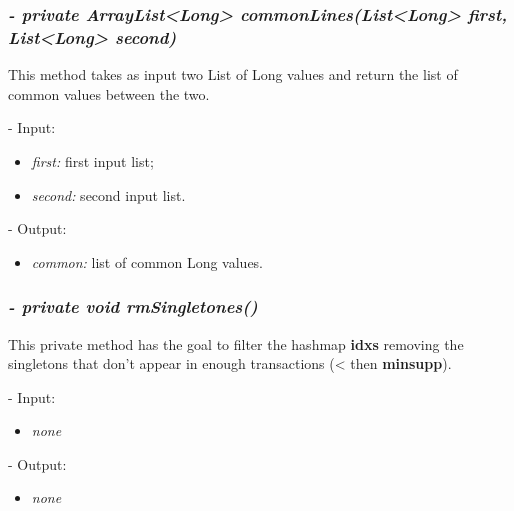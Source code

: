 \documentclass[]{report}
\begin{document}
	\subsubsection*{\textit{\textbf{-} private ArrayList<Long> commonLines(List<Long> first, List<Long> second)}}   	
	This method takes as input two List of Long values and return the list of common values between the two.    
	\begin{description}
		\item - Input:
		\begin{itemize}
			\item \textit{first:} first input list;
			\item \textit{second:} second input list.
		\end{itemize}
	\end{description}	
	\begin{description}
		\item - Output:
		\begin{itemize}
			\item \textit{common:} list of common Long values. 
		\end{itemize}
	\end{description}
	
	\subsubsection*{\textit{\textbf{-} private void rmSingletones()}}   	
	This private method has the goal to filter the hashmap \textbf{idxs} removing the singletons that don't appear in enough transactions (< then \textbf{minsupp}).   
	\begin{description}
		\item - Input:
		\begin{itemize}
			\item \textit{none}
		\end{itemize}
	\end{description}	
	\begin{description}
		\item - Output:
		\begin{itemize}
			\item \textit{none} 
		\end{itemize}
	\end{description}
	
\end{document}
